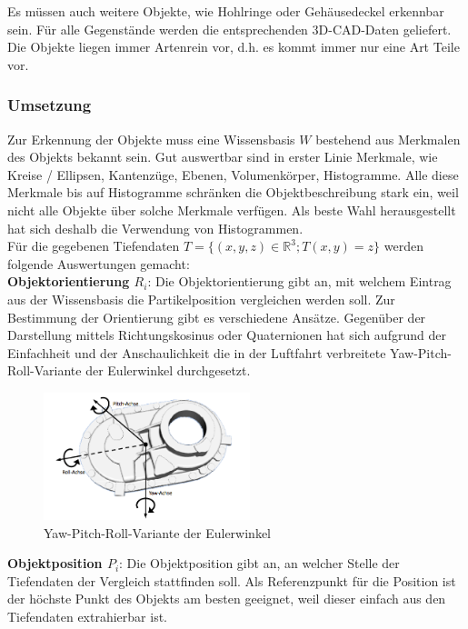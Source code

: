 Es müssen auch weitere Objekte, wie Hohlringe oder Gehäusedeckel erkennbar sein. Für alle Gegenstände werden die entsprechenden 3D-CAD-Daten geliefert. Die Objekte liegen immer Artenrein vor, d.h. es kommt immer nur eine Art Teile vor. \\

\subsubsection{Umsetzung}
Zur Erkennung der Objekte muss eine Wissensbasis $W$ bestehend aus Merkmalen des Objekts bekannt sein. Gut auswertbar sind in erster Linie Merkmale, wie Kreise / Ellipsen, Kantenzüge, Ebenen, Volumenkörper, Histogramme. Alle diese Merkmale bis auf Histogramme schränken die Objektbeschreibung stark ein, weil nicht alle Objekte über solche Merkmale verfügen. Als beste Wahl herausgestellt hat sich deshalb die Verwendung von Histogrammen. \\

Für die gegebenen Tiefendaten $T = \{ (x,y,z) \in \mathbb{R}^3 ; T(x,y)=z\}$ werden folgende Auswertungen gemacht: \\

\textbf{Objektorientierung $R_i$}: Die Objektorientierung gibt an, mit welchem Eintrag aus der Wissensbasis die Partikelposition vergleichen werden soll. Zur Bestimmung der Orientierung gibt es verschiedene Ansätze. Gegenüber der Darstellung mittels Richtungskosinus oder Quaternionen hat sich aufgrund der Einfachheit und der Anschaulichkeit die in der Luftfahrt verbreitete Yaw-Pitch-Roll-Variante der Eulerwinkel durchgesetzt.

\begin{figure}[htbp]
	\centering
	\includegraphics[width=6cm]{images/yaw-pitch-roll}
	\caption{Yaw-Pitch-Roll-Variante der Eulerwinkel}
	\label{Fig-Yaw-Pitch-Roll}
\end{figure}

\textbf{Objektposition $P_i$}: Die Objektposition gibt an, an welcher Stelle der Tiefendaten der Vergleich stattfinden soll. Als Referenzpunkt für die Position ist der höchste Punkt des Objekts am besten geeignet, weil dieser einfach aus den Tiefendaten extrahierbar ist. \\

